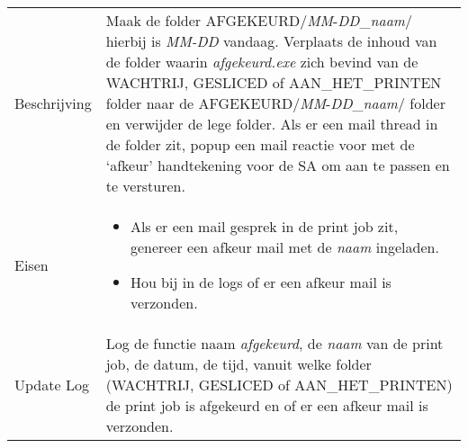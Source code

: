 \documentclass{article}
\begin{document}
\begin{table}[H]
    \centering
    \begin{tabular}%
    {>{\raggedright\arraybackslash}p{}%
    |>{\raggedright\arraybackslash}p{}}
    \rowcolor{myblue} \multicolumn{2}{c}{\rule{0pt}{13pt}Functie: {\Large afgekeurd.exe}} \\\hline
    Beschrijving & Maak de folder AFGEKEURD/\textit{MM}-\textit{DD}\_\textit{naam}/ hierbij is \textit{MM-DD} vandaag. Verplaats de inhoud van de folder waarin \textit{afgekeurd.exe} zich bevind van de WACHTRIJ, GESLICED of AAN\_HET\_PRINTEN folder naar de AFGEKEURD/\textit{MM}-\textit{DD}\_\textit{naam}/ folder en verwijder de lege folder. Als er een mail thread in de folder zit, popup een mail reactie voor met de `afkeur' handtekening voor de SA om aan te passen en te versturen.\\
    Eisen & 
    \begin{itemize} 
\item Als er een mail gesprek in de print job zit, genereer een afkeur mail met de \textit{naam} ingeladen.
\item Hou bij in de logs of er een afkeur mail is verzonden.
\end{itemize} \\
  Update Log& Log de functie naam \textit{afgekeurd}, de \textit{naam} van de print job, de datum, de tijd, vanuit welke folder (WACHTRIJ, GESLICED of AAN\_HET\_PRINTEN) de print job is afgekeurd en of er een afkeur mail is verzonden.\\
    \end{tabular}
\end{table}
\end{document}
